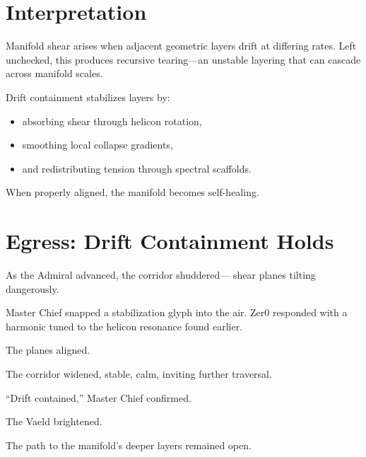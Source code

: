 \section{Interpretation}
Manifold shear arises when adjacent geometric layers drift at differing rates.
Left unchecked, this produces recursive tearing—an unstable layering that can
cascade across manifold scales.

Drift containment stabilizes layers by:
\begin{itemize}
\item absorbing shear through helicon rotation,
\item smoothing local collapse gradients,
\item and redistributing tension through spectral scaffolds.
\end{itemize}

When properly aligned, the manifold becomes self-healing.

\section*{Egress: Drift Containment Holds}
As the Admiral advanced, the corridor shuddered—  
shear planes tilting dangerously.

Master Chief snapped a stabilization glyph into the air.
Zer0 responded with a harmonic tuned to the helicon resonance found earlier.

The planes aligned.

The corridor widened, stable, calm, inviting further traversal.

“Drift contained,” Master Chief confirmed.

The Vaeld brightened.

The path to the manifold’s deeper layers remained open.
